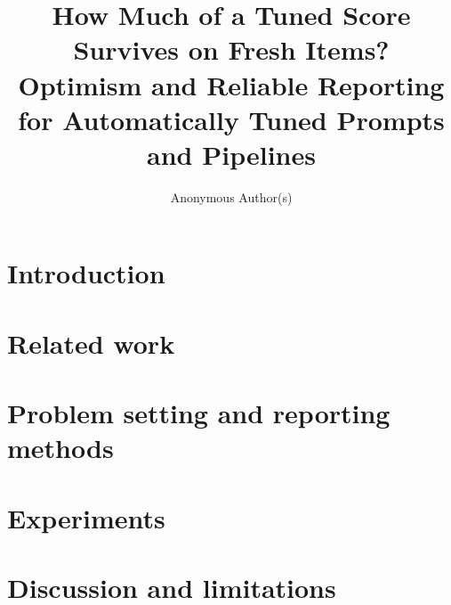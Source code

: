 \documentclass{article}
\title{How Much of a Tuned Score Survives on Fresh Items? Optimism and Reliable Reporting for Automatically Tuned Prompts and Pipelines}
\author{Anonymous Author(s)}
\begin{document}
\maketitle

\begin{abstract}

\end{abstract}

\section{Introduction}\label{sec:intro}


\section{Related work}\label{sec:related}


\section{Problem setting and reporting methods}\label{sec:method}


\section{Experiments}\label{sec:experiments}


\section{Discussion and limitations}\label{sec:discussion}





\appendix



\end{document}
